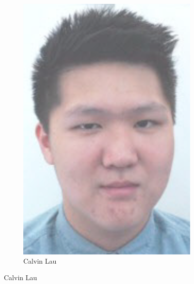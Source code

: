 \begin{figure}
\begin{subfigure}[b]{0.45\textwidth}
        \includegraphics[height=0.3\textheight]{Files/CL}
        \caption{Calvin Lau}
    \end{subfigure}
\end{figure}
